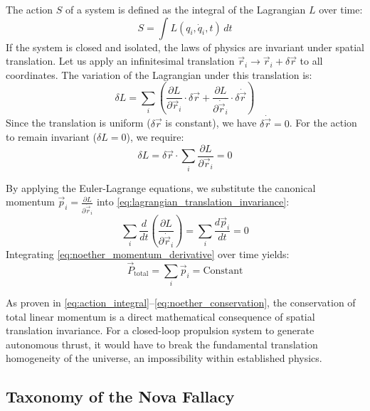 \documentclass[journal,10pt,twoside]{IEEEtran}
\begin{document}
The action $S$ of a system is defined as the integral of the Lagrangian $L$ over time:
\begin{equation}
S = \int L(q_i, \dot{q}_i, t) \, dt
\label{eq:action_integral}
\end{equation}
If the system is closed and isolated, the laws of physics are invariant under spatial translation. Let us apply an infinitesimal translation $\vec{r}_i \to \vec{r}_i + \delta \vec{r}$ to all coordinates. The variation of the Lagrangian under this translation is:
\begin{equation}
\delta L = \sum_{i} \left( \frac{\partial L}{\partial \vec{r}_i} \cdot \delta \vec{r} + \frac{\partial L}{\partial \dot{\vec{r}}_i} \cdot \delta \dot{\vec{r}} \right)
\label{eq:lagrangian_variation}
\end{equation}
Since the translation is uniform ($\delta \vec{r}$ is constant), we have $\delta \dot{\vec{r}} = 0$. For the action to remain invariant ($\delta L = 0$), we require:
\begin{equation}
\delta L = \delta \vec{r} \cdot \sum_{i} \frac{\partial L}{\partial \vec{r}_i} = 0
\label{eq:lagrangian_translation_invariance}
\end{equation}

By applying the Euler-Lagrange equations, we substitute the canonical momentum $\vec{p}_i = \frac{\partial L}{\partial \dot{\vec{r}}_i}$ into \eqref{eq:lagrangian_translation_invariance}:
\begin{equation}
\sum_{i} \frac{d}{dt} \left( \frac{\partial L}{\partial \dot{\vec{r}}_i} \right) = \sum_{i} \frac{d\vec{p}_i}{dt} = 0
\label{eq:noether_momentum_derivative}
\end{equation}
Integrating \eqref{eq:noether_momentum_derivative} over time yields:
\begin{equation}
\vec{P}_{\text{total}} = \sum_{i} \vec{p}_i = \text{Constant}
\label{eq:noether_conservation}
\end{equation}

As proven in \eqref{eq:action_integral}--\eqref{eq:noether_conservation}, the conservation of total linear momentum is a direct mathematical consequence of spatial translation invariance. For a closed-loop propulsion system to generate autonomous thrust, it would have to break the fundamental translation homogeneity of the universe, an impossibility within established physics.

\subsection{Taxonomy of the Nova Fallacy}
\end{document}
